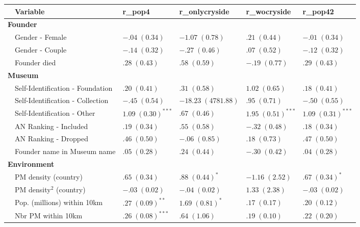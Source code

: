 \documentclass[12pt]{article}
\begin{document}
\begin{table}[ht]
\centering
\begin{tabular}{p{0mm}lllll}
  \hline 
 \multicolumn{1}{l}{} & \multicolumn{1}{l}{Variable} & \multicolumn{1}{l}{r\_pop4} & \multicolumn{1}{l}{r\_onlycryside} & \multicolumn{1}{l}{r\_wocryside} & \multicolumn{1}{l}{r\_pop42}\\ 
 \hline
  \multicolumn{6}{l}{\textbf{Founder}} \\ 
 & Gender - Female & $-.04 \; (0.34)$ & $-1.07 \; (0.78)$ & $.21 \; (0.44)$ & $-.01 \; (0.34)$ \\ 
   & Gender - Couple & $-.14 \; (0.32)$ & $-.27 \; (0.46)$ & $.07 \; (0.52)$ & $-.12 \; (0.32)$ \\ 
   & Founder died & $.28 \; (0.43)$ & $.58 \; (0.59)$ & $-.19 \; (0.77)$ & $.29 \; (0.43)$ \\ 
   \multicolumn{6}{l}{\textbf{Museum}} \\ 
 & Self-Identification - Foundation & $.20 \; (0.41)$ & $.31 \; (0.58)$ & $1.02 \; (0.65)$ & $.18 \; (0.41)$ \\ 
   & Self-Identification - Collection & $-.45 \; (0.54)$ & $-18.23 \; (4781.88)$ & $.95 \; (0.71)$ & $-.50 \; (0.55)$ \\ 
   & Self-Identification - Other & $1.09 \; (0.30)^{***}$ & $.67 \; (0.46)$ & $1.95 \; (0.51)^{***}$ & $1.09 \; (0.31)^{***}$ \\ 
   & AN Ranking - Included & $.19 \; (0.34)$ & $.55 \; (0.58)$ & $-.32 \; (0.48)$ & $.18 \; (0.34)$ \\ 
   & AN Ranking - Dropped & $.46 \; (0.50)$ & $-.06 \; (0.85)$ & $.18 \; (0.73)$ & $.47 \; (0.50)$ \\ 
   & Founder name in Museum name & $.05 \; (0.28)$ & $.24 \; (0.44)$ & $-.30 \; (0.42)$ & $.04 \; (0.28)$ \\ 
   \multicolumn{6}{l}{\textbf{Environment}} \\ 
 & PM density (country) & $.65 \; (0.34)$ & $.88 \; (0.44)^{*}$ & $-1.16 \; (2.52)$ & $.67 \; (0.34)^{*}$ \\ 
   & PM density$^{2}$ (country) & $-.03 \; (0.02)$ & $-.04 \; (0.02)$ & $1.33 \; (2.38)$ & $-.03 \; (0.02)$ \\ 
   & Pop. (millions) within 10km & $.27 \; (0.09)^{**}$ & $1.69 \; (0.81)^{*}$ & $.17 \; (0.17)$ & $.20 \; (0.12)$ \\ 
   & Nbr PM within 10km & $.26 \; (0.08)^{***}$ & $.64 \; (1.06)$ & $.19 \; (0.10)$ & $.22 \; (0.20)$ \\ 

\end{tabular}
\end{table}
\end{document}
